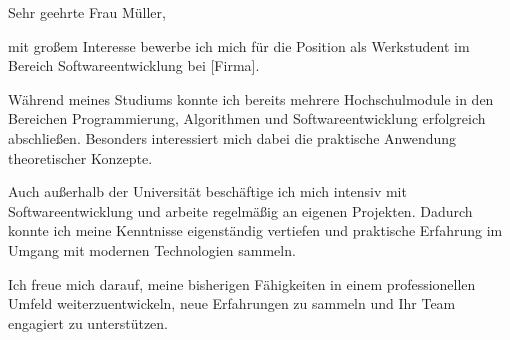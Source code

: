 Sehr geehrte Frau Müller,

mit großem Interesse bewerbe ich mich für die Position als Werkstudent im Bereich Softwareentwicklung bei [Firma].

Während meines Studiums konnte ich bereits mehrere Hochschulmodule in den Bereichen Programmierung, Algorithmen und Softwareentwicklung erfolgreich abschließen. Besonders interessiert mich dabei die praktische Anwendung theoretischer Konzepte.

Auch außerhalb der Universität beschäftige ich mich intensiv mit Softwareentwicklung und arbeite regelmäßig an eigenen Projekten. Dadurch konnte ich meine Kenntnisse eigenständig vertiefen und praktische Erfahrung im Umgang mit modernen Technologien sammeln.

Ich freue mich darauf, meine bisherigen Fähigkeiten in einem professionellen Umfeld weiterzuentwickeln, neue Erfahrungen zu sammeln und Ihr Team engagiert zu unterstützen.

